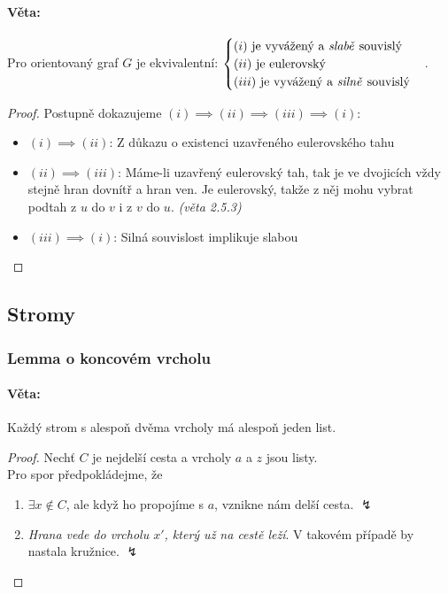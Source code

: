 \documentclass[10pt,a4paper]{article}
\begin{document}
\paragraph*{Věta: } Pro orientovaný  graf $G$ je ekvivalentní: $\begin{cases}
    (i) \text{ je vyvážený a \textit{slabě} souvislý}\\
    (ii) \text{ je eulerovský}\\
    (iii) \text{ je vyvážený a \textit{silně} souvislý}\\
\end{cases}$.
\begin{proof} 
    Postupně dokazujeme $(i) \implies (ii) \implies (iii) \implies (i)$:
    \begin{itemize}
        \item [ ] $(i) \implies (ii)$: Z důkazu o existenci uzavřeného eulerovského tahu
        \item [ ] $(ii) \implies (iii)$: Máme-li uzavřený eulerovský tah, tak je ve dvojicích vždy stejně hran dovnítř a hran ven. Je eulerovský, takže z něj mohu vybrat podtah z $u$ do $v$ i z $v$ do $u$. \textit{(věta 2.5.3)}
        \item [ ] $(iii) \implies (i)$: Silná souvislost implikuje slabou
    \end{itemize}

    
\end{proof}


\subsection{Stromy}

\subsubsection{Lemma o koncovém vrcholu}
\paragraph*{Věta: } Každý strom s alespoň dvěma vrcholy má alespoň jeden list.
\begin{proof} Nechť $C$ je nejdelší cesta a vrcholy $a$ a $z$ jsou listy.\\
    Pro spor předpokládejme, že
    \begin{enumerate}
        \item $\exists x\notin C$, ale když ho propojíme s $a$, vznikne nám delší cesta. $\lightning$
        \item \textit{Hrana vede do vrcholu $x'$, který už na cestě leží}. V takovém případě by nastala kružnice. $\lightning$
    \end{enumerate}
\end{proof}
\end{document}
